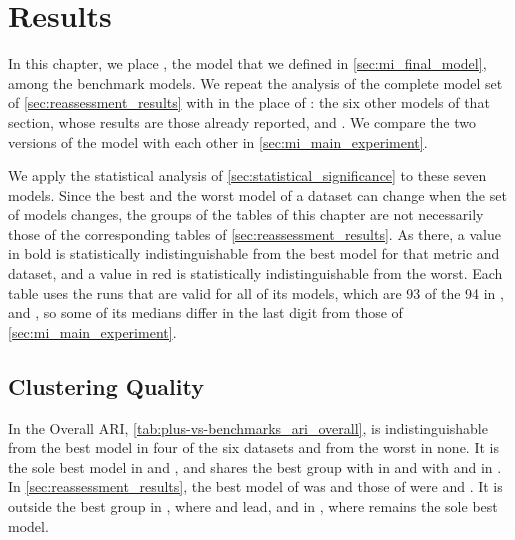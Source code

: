 \chapter{Results}
\label{chap:results}

In this chapter, we place \MicroTEDAClusPlus, the model that we defined in \cref{sec:mi_final_model}, among the benchmark models. We repeat the analysis of the complete model set of \cref{sec:reassessment_results} with \MicroTEDAClusPlus in the place of \MicroTEDAClus: the six other models of that section, whose results are those already reported, and \MicroTEDAClusPlus. We compare the two versions of the model with each other in \cref{sec:mi_main_experiment}.

We apply the statistical analysis of \cref{sec:statistical_significance} to these seven models. Since the best and the worst model of a dataset can change when the set of models changes, the groups of the tables of this chapter are not necessarily those of the corresponding tables of \cref{sec:reassessment_results}. As there, a value in bold is statistically indistinguishable from the best model for that metric and dataset, and a value in red is statistically indistinguishable from the worst. Each table uses the runs that are valid for all of its models, which are 93 of the 94 in \BenchmarkOne, \BenchmarkTwo and \RandomRBFGeneratorEvents, so some of its medians differ in the last digit from those of \cref{sec:mi_main_experiment}.

\section{Clustering Quality}
\label{sec:results_quality}






In the Overall ARI, \cref{tab:plus-vs-benchmarks_ari_overall}, \MicroTEDAClusPlus is indistinguishable from the best model in four of the six datasets and from the worst in none. It is the sole best model in \BenchmarkOne and \BenchmarkTwo, and shares the best group with \TEDACloud in \RandomRBFGeneratorEvents and with \CluStream and \StreamKM in \ChameleonDSFour. In \cref{sec:reassessment_results}, the best model of \BenchmarkOne was \TEDACloud and those of \BenchmarkTwo were \CluStream and \MicroTEDAClus. It is outside the best group in \ChameleonDSThree, where \CluStream and \StreamKM lead, and in \Cassini, where \StreamKM remains the sole best model.


